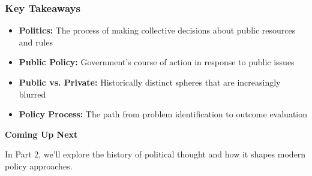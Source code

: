 \documentclass[10pt]{beamer}
\begin{document}
\begin{frame}
\frametitle{Key Takeaways}

\begin{block}{}
\begin{itemize}
\item \textbf{Politics:} The process of making collective decisions about public resources and rules
\item \textbf{Public Policy:} Government's course of action in response to public issues
\item \textbf{Public vs. Private:} Historically distinct spheres that are increasingly blurred
\item \textbf{Policy Process:} The path from problem identification to outcome evaluation
\end{itemize}
\end{block}

\pause
\vspace{1cm}
\begin{center}
\textbf{Coming Up Next}

In Part 2, we'll explore the history of political thought and how it shapes modern policy approaches.
\end{center}

\end{frame}
\end{document}
